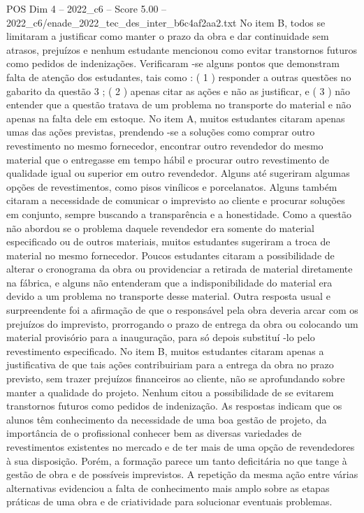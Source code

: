 \begin{textsample}{POS Dim 4 – 2022\_c6 – Score 5.00 – 2022\_c6/enade\_2022\_tec\_des\_inter\_b6c4af2aa2.txt}
No item B, todos se limitaram a justificar como manter o prazo da obra e dar continuidade sem atrasos, prejuízos e nenhum estudante mencionou como evitar transtornos futuros como pedidos de indenizações.
Verificaram -se alguns pontos que demonstram falta de atenção dos estudantes, tais como : ( 1 ) responder a outras questões no gabarito da questão 3 ; ( 2 ) apenas citar as ações e não as justificar, e ( 3 ) não entender que a questão tratava de um problema no transporte do material e não apenas na falta dele em estoque.
No item A, muitos estudantes citaram apenas umas das ações previstas, prendendo -se a soluções como comprar outro revestimento no mesmo fornecedor, encontrar outro revendedor do mesmo material que o entregasse em tempo hábil e procurar outro revestimento de qualidade igual ou superior em outro revendedor.
Alguns até sugeriram algumas opções de revestimentos, como pisos vinílicos e porcelanatos.
Alguns também citaram a necessidade de comunicar o imprevisto ao cliente e procurar soluções em conjunto, sempre buscando a transparência e a honestidade.
Como a questão não abordou se o problema daquele revendedor era somente do material especificado ou de outros materiais, muitos estudantes sugeriram a troca de material no mesmo fornecedor.
Poucos estudantes citaram a possibilidade de alterar o cronograma da obra ou providenciar a retirada de material diretamente na fábrica, e alguns não entenderam que a indisponibilidade do material era devido a um problema no transporte desse material.
Outra resposta usual e surpreendente foi a afirmação de que o responsável pela obra deveria arcar com os prejuízos do imprevisto, prorrogando o prazo de entrega da obra ou colocando um material provisório para a inauguração, para só depois substituí -lo pelo revestimento especificado.
No item B, muitos estudantes citaram apenas a justificativa de que tais ações contribuiriam para a entrega da obra no prazo previsto, sem trazer prejuízos financeiros ao cliente, não se aprofundando sobre manter a qualidade do projeto.
Nenhum citou a possibilidade de se evitarem transtornos futuros como pedidos de indenização.
As respostas indicam que os alunos têm conhecimento da necessidade de uma boa gestão de projeto, da importância de o profissional conhecer bem as diversas variedades de revestimentos existentes no mercado e de ter mais de uma opção de revendedores à sua disposição.
Porém, a formação parece um tanto deficitária no que tange à gestão de obra e de possíveis imprevistos.
A repetição da mesma ação entre várias alternativas evidenciou a falta de conhecimento mais amplo sobre as etapas práticas de uma obra e de criatividade para solucionar eventuais problemas.

\end{textsample}
